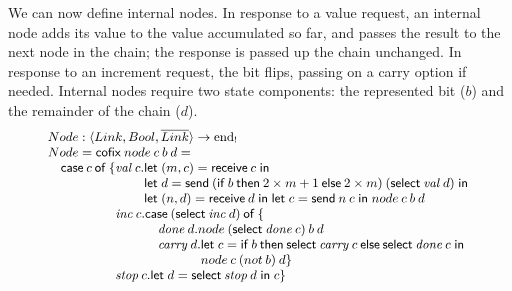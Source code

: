 \documentclass[orivec,envcountsame]{llncs}
\makeatletter
\newcommand{\gvdual}[1]{\overline{#1}}
\newcommand{\uto}{\ensuremath{\rightarrow}}
\newcommand{\outterm}{\mathrm{end}_!}
\newcommand{\mkwd}[1]{\mathsf{#1}}
\newcommand{\clabel}[1]{\mathit{#1}}
\newcommand{\gvsend}[2]{\mkwd{send}\:#1\:#2}
\newcommand{\gvreceive}[1]{\mkwd{receive}\:#1}
\newcommand{\gvlet}[3]{\mkwd{let}\;#1 = #2\;\mkwd{in}\;#3}
\newcommand{\gvselect}[2]{\mkwd{select}\:#1\:#2}
\newcommand{\lrkwd}{\mkwd{cofix}}
\newcommand{\gvifthen}[3]{\mkwd{if}\:#1\:\mkwd{then}\:#2\:\mkwd{else}\:#3}
\newcommand{\ba}{\begin{array}}
\newcommand{\ea}{\end{array}}
\newcommand{\bl}{\ba[t]{@{}l@{}}}
\newcommand{\el}{\ea}
\makeatother
\begin{document}
We can now define internal nodes. In response to a value request, an internal node adds its value to
the value accumulated so far, and passes the result to the next node in the chain; the response is
passed up the chain unchanged. In response to an increment request, the bit flips, passing on a
carry option if needed. Internal nodes require two state components: the represented bit ($b$) and
the remainder of the chain ($d$).
%
\[\small
\bl
Node : \langle Link, Bool, \gvdual{Link} \rangle \uto \outterm \\
Node = \lrkwd\:node\:c\:b\:d = \\
\quad
  \bl
  \mkwd{case}\:c\:\mkwd{of}\:\{
      \bl
      \clabel{val}\:c.
        \bl
        \gvlet{(m,c)}{\gvreceive{c}}{} \\
        \gvlet{d}{\gvsend{(\gvifthen{b}{2 \times m + 1}{2 \times m})}{(\gvselect{\clabel{val}}{d})}}{} \\
        \gvlet{(n,d)}{\gvreceive{d}}{
        \gvlet{c}{\gvsend{n}{c}}{
        node\:c\:b\:d}} \\
        \el \\
      \clabel{inc}\:c.
        \bl
        \mkwd{case}\:(\gvselect{\clabel{inc}}{d})\:\mkwd{of}\:\{ \\
        \quad
          \bl
          \clabel{done}\:d. node\:(\gvselect{\clabel{done}}{c})\:b\:d \\
          \clabel{carry}\:d.
            \bl
            \gvlet{c}{\gvifthen{b}{\gvselect{\clabel{carry}}{c}}{\gvselect{\clabel{done}}{c}}}{} \\
            node\:c\:(not\:b)\:d \} \\
            \el \\
          \el \\
        \el \\
      \clabel{stop}\:c.\gvlet{d}{\gvselect{\clabel{stop}}{d}}{c} \} \\
      \el \\
  \el \\
\el
\]
\end{document}
